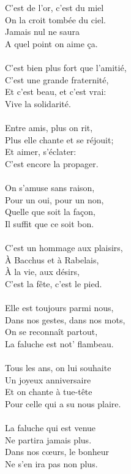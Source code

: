 {    \\\\C'est de l'or, c'est du miel
    \\On la croit tombée du ciel.
    \\Jamais nul ne saura
    \\A quel point on aime ça.
    \\\\C'est bien plus fort que l'amitié,
    \\C'est une grande fraternité,
    \\Et c'est beau, et c'est vrai:
    \\Vive la solidarité.
    \\\\Entre amis, plus on rit,
    \\Plus elle chante et se réjouit;
    \\Et aimer, s'éclater:
    \\C'est encore la propager.
    \\\\On s'amuse sans raison,
    \\Pour un oui, pour un non,
    \\Quelle que soit la façon,
    \\Il suffit que ce soit bon.
    \\\\C'est un hommage aux plaisirs,
    \\À Bacchus et à Rabelais,
    \\À la vie, aux désirs,
    \\C'est la fête, c'est le pied.
    \\\\Elle est toujours parmi nous,
    \\Dans nos gestes, dans nos mots,
    \\On se reconnaît partout,
    \\La faluche est not' flambeau.
    \\\\Tous les ans, on lui souhaite 
    \\Un joyeux anniversaire
    \\Et on chante à tue-tête 
    \\Pour celle qui a su nous plaire.
    \\\\La faluche qui est venue 
    \\Ne partira jamais plus.
    \\Dans nos cœurs, le bonheur 
    \\Ne s'en ira pas non plus.
}

\blackline
